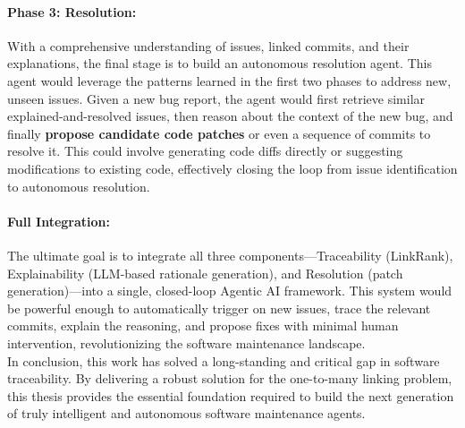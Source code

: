     \paragraph{Phase 3: Resolution:} With a comprehensive understanding of issues, linked commits, and their explanations, the final stage is to build an autonomous resolution agent. This agent would leverage the patterns learned in the first two phases to address new, unseen issues. Given a new bug report, the agent would first retrieve similar explained-and-resolved issues, then reason about the context of the new bug, and finally \textbf{propose candidate code patches} or even a sequence of commits to resolve it. This could involve generating code diffs directly or suggesting modifications to existing code, effectively closing the loop from issue identification to autonomous resolution.

    \paragraph{Full Integration:} The ultimate goal is to integrate all three components---Traceability (LinkRank), Explainability (LLM-based rationale generation), and Resolution (patch generation)---into a single, closed-loop Agentic AI framework. This system would be powerful enough to automatically trigger on new issues, trace the relevant commits, explain the reasoning, and propose fixes with minimal human intervention, revolutionizing the software maintenance landscape.\\

\noindent
In conclusion, this work has solved a long-standing and critical gap in software traceability. By delivering a robust solution for the one-to-many linking problem, this thesis provides the essential foundation required to build the next generation of truly intelligent and autonomous software maintenance agents.
